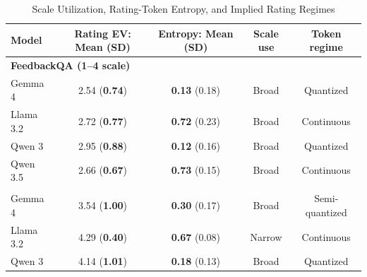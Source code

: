 \begin{table}[!t]
    \centering
    \small
    \caption{Scale Utilization, Rating-Token Entropy, and Implied Rating Regimes}
    \label{tab:scale_utilization}
    \setlength{\tabcolsep}{4.5pt}
    \begin{tabular}{lcccc}
    \toprule
    Model & Rating EV: Mean (SD) & Entropy: Mean (SD) & Scale use & Token regime \\
    \midrule

    \multicolumn{5}{l}{\textbf{FeedbackQA (1--4 scale)}} \\
    Gemma 4   
        & \cellcolor{scaleBroad}2.54 (\textbf{0.74}) 
        & \cellcolor{entropyQuantized}\textbf{0.13} (0.18) 
        & \cellcolor{scaleBroad}Broad 
        & \cellcolor{entropyQuantized}Quantized \\

    Llama 3.2 
        & \cellcolor{scaleBroad}2.72 (\textbf{0.77}) 
        & \cellcolor{entropyContinuous}\textbf{0.72} (0.23) 
        & \cellcolor{scaleBroad}Broad 
        & \cellcolor{entropyContinuous}Continuous \\

    Qwen 3    
        & \cellcolor{scaleBroad}2.95 (\textbf{0.88}) 
        & \cellcolor{entropyQuantized}\textbf{0.12} (0.16) 
        & \cellcolor{scaleBroad}Broad 
        & \cellcolor{entropyQuantized}Quantized \\

    Qwen 3.5  
        & \cellcolor{scaleBroad}2.66 (\textbf{0.67}) 
        & \cellcolor{entropyContinuous}\textbf{0.73} (0.15) 
        & \cellcolor{scaleBroad}Broad 
        & \cellcolor{entropyContinuous}Continuous \\

    \addlinespace[0.4em]
    \multicolumn{5}{l}{\textbf{Barter Deals (1--7 scale)}} \\

    Gemma 4   
        & \cellcolor{scaleBroad}3.54 (\textbf{1.00}) 
        & \cellcolor{entropySemi}\textbf{0.30} (0.17) 
        & \cellcolor{scaleBroad}Broad 
        & \cellcolor{entropySemi}Semi-quantized \\

    Llama 3.2 
        & \cellcolor{scaleNarrow}4.29 (\textbf{0.40}) 
        & \cellcolor{entropyContinuous}\textbf{0.67} (0.08) 
        & \cellcolor{scaleNarrow}Narrow 
        & \cellcolor{entropyContinuous}Continuous \\

    Qwen 3    
        & \cellcolor{scaleBroad}4.14 (\textbf{1.01}) 
        & \cellcolor{entropyQuantized}\textbf{0.18} (0.13) 
        & \cellcolor{scaleBroad}Broad 
        & \cellcolor{entropyQuantized}Quantized \\


\end{tabular}
\end{table}
